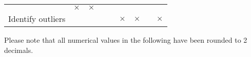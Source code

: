 \documentclass[
]{report}
\begin{document}
\begin{longtable}[]{@{}lcccccccc@{}}
\begin{minipage}[t]{0.06\columnwidth}
\end{minipage} & \begin{minipage}[t]{0.06\columnwidth}\centering
\(\times\)\strut
\end{minipage} & \begin{minipage}[t]{0.09\columnwidth}\centering
\(\times\)\strut
\end{minipage} & \begin{minipage}[t]{0.06\columnwidth}\centering
\strut
\end{minipage} & \begin{minipage}[t]{0.06\columnwidth}\centering
\strut
\end{minipage} & \begin{minipage}[t]{0.05\columnwidth}\centering
\strut
\end{minipage} & \begin{minipage}[t]{0.06\columnwidth}\centering
\strut
\end{minipage}\tabularnewline
\begin{minipage}[t]{0.28\columnwidth}\raggedright
Identify outliers\strut
\end{minipage} & \begin{minipage}[t]{0.06\columnwidth}\centering
\strut
\end{minipage} & \begin{minipage}[t]{0.06\columnwidth}\centering
\strut
\end{minipage} & \begin{minipage}[t]{0.06\columnwidth}\centering
\strut
\end{minipage} & \begin{minipage}[t]{0.09\columnwidth}\centering
\strut
\end{minipage} & \begin{minipage}[t]{0.06\columnwidth}\centering
\(\times\)\strut
\end{minipage} & \begin{minipage}[t]{0.06\columnwidth}\centering
\(\times\)\strut
\end{minipage} & \begin{minipage}[t]{0.05\columnwidth}\centering
\strut
\end{minipage} & \begin{minipage}[t]{0.06\columnwidth}\centering
\(\times\)\strut
\end{minipage}\tabularnewline
\bottomrule
\end{longtable}

Please note that all numerical values in the following have been rounded
to 2 decimals.
\end{document}
